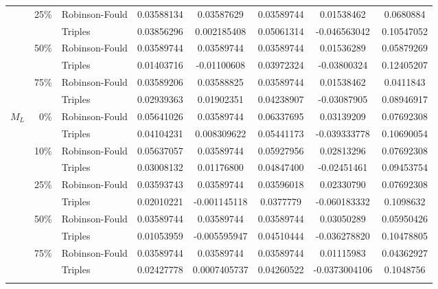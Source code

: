 \documentclass[12pt,letterpaper]{article}
\begin{document}
\begin{table}
\begin{tabular}{rrlccccc}
              & 25\%         & Robinson-Fould & 0.03588134 & 0.03587629  & 0.03589744 & 0.01538462  & 0.0680884 \\
              &              & Triples        & 0.03856296 & 0.002185408  & 0.05061314 & -0.046563042  & 0.10547052 \\
              & 50\%         & Robinson-Fould & 0.03589744 & 0.03589744  & 0.03589744 & 0.01536289  & 0.05879269 \\
              &              & Triples        & 0.01403716 & -0.01100608  & 0.03972324 & -0.03800324  & 0.12405207 \\
              & 75\%         & Robinson-Fould & 0.03589206 & 0.03588825  & 0.03589744 & 0.01538462  & 0.0411843 \\
              &              & Triples        & 0.02939363 & 0.01902351  & 0.04238907 & -0.03087905  & 0.08946917 \\   
    $M_L$     & 0\%          & Robinson-Fould & 0.05641026 & 0.03589744  & 0.06337695 & 0.03139209  & 0.07692308 \\
              &              & Triples        & 0.04104231 & 0.008309622  & 0.05441173 & -0.039333778  & 0.10690054 \\
              & 10\%         & Robinson-Fould & 0.05637057 & 0.03589744  & 0.05927956 & 0.02813296  & 0.07692308 \\
              &              & Triples        & 0.03008132 & 0.01176800  & 0.04847400 & -0.02451461  & 0.09453754 \\
              & 25\%         & Robinson-Fould & 0.03593743 & 0.03589744  & 0.03596018 & 0.02330790  & 0.07692308 \\
              &              & Triples        & 0.02010221 & -0.001145118  & 0.0377779 & -0.060183332  & 0.1098632 \\
              & 50\%         & Robinson-Fould & 0.03589744 & 0.03589744  & 0.03589744 & 0.03050289  & 0.05950426 \\
              &              & Triples        & 0.01053959 & -0.005595947  & 0.04510444 & -0.036278820  & 0.10478805 \\
              & 75\%         & Robinson-Fould & 0.03589744 & 0.03589744  & 0.03589744 & 0.01115983  & 0.04362927 \\
              &              & Triples        & 0.02427778 & 0.0007405737  & 0.04260522 & -0.0373004106  & 0.1048756 \\
\label{NTSBA_full}
\end{tabular}
\end{table}
\end{document}
